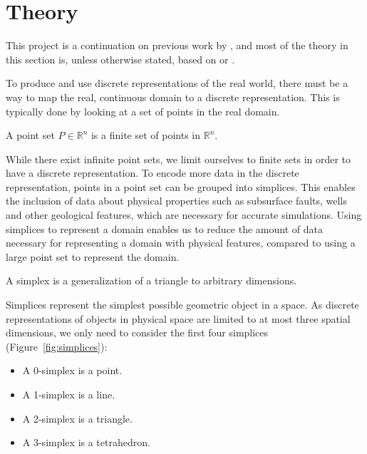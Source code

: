 \section{Theory}
\label{sec:Theory}
This project is a continuation on previous work by \textcite{UPR_thesis}, and most of the theory in this section is, unless otherwise stated, based on \textcite{UPR_thesis} or \textcite{UPR_chapter}.

To produce and use discrete representations of the real world, there must be a way to map the real, continuous domain to a discrete representation. This is typically done by looking at a set of points in the real domain.

\begin{definition}
A point set $P \in \mathbb{R}^n$ is a finite set of points in $\mathbb{R}^n$.
\end{definition}
While there exist infinite point sets, we limit ourselves to finite sets in order to have a discrete representation. To encode more data in the discrete representation, points in a point set can be grouped into simplices. This enables the inclusion of data about physical properties such as subsurface faults, wells and other geological features, which are necessary for accurate simulations. Using simplices to represent a domain enables us to reduce the amount of data necessary for representing a domain with physical features, compared to using a large point set to represent the domain.


\begin{definition}[Simplex]
A simplex is a generalization of a triangle to arbitrary dimensions.
\end{definition}
Simplices represent the simplest possible geometric object in a space. As discrete representations of objects in physical space are limited to at most three spatial dimensions, we only need to consider the first four simplices (Figure~\ref{fig:simplices}):
\begin{itemize}
    \item A 0-simplex is a point.
    \item A 1-simplex is a line.
    \item A 2-simplex is a triangle.
    \item A 3-simplex is a tetrahedron.
\end{itemize}

